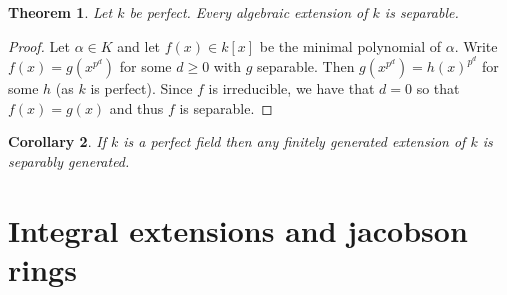 \documentclass[12pt]{article}
\theoremstyle{plain}
\newtheorem{thm}{Theorem}[subsection] %
\newtheorem{cor}[thm]{Corollary}
\theoremstyle{definition}
\begin{document}
	\begin{thm}
		\label{thm:perf_fin_sep} Let $k$ be perfect. Every algebraic extension of $k$ is separable.
	\end{thm}
	\begin{proof}
		Let $\alpha \in K$ and let $f(x) \in k[x]$ be the minimal polynomial of $\alpha$. Write $f(x) = g(x^{p^{d}})$ for some $d \geq 0$ with $g$ separable. Then $g(x^{p^{d}}) = h(x)^{p^{d}}$ for some $h$ (as $k$ is perfect). Since $f$ is irreducible, we have that $d = 0$ so that $f(x) = g(x)$ and thus $f$ is separable.
	\end{proof}
	\begin{cor}
		If $k$ is a perfect field then any finitely generated extension of $k$ is separably generated.
	\end{cor}
	\section{Integral extensions and jacobson rings}
	\label{sec:integral_extensions_jacobson_rings}
\end{document}
